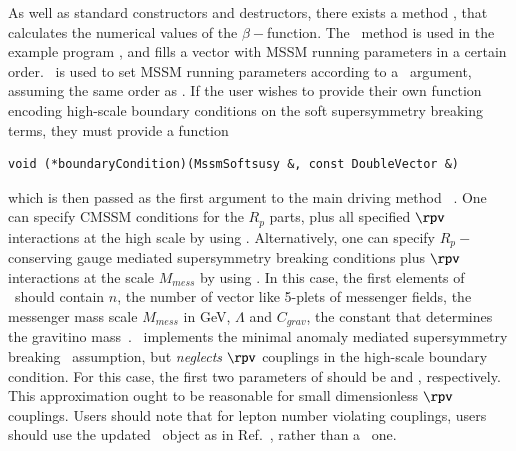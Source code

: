 \documentclass[final,3p,times,pdflatex]{elsarticle}
\begin{document}
As well as standard constructors and destructors, there exists a
  method , that calculates the numerical values of the
  $\beta-$function\@. The ~method is used in the example program
  , and fills a vector with MSSM running parameters in a
  certain   order. 
 ~is used to set MSSM running parameters according to a
 ~argument, assuming the same order as .
 If the user
  wishes to provide their own function encoding high-scale boundary conditions
  on the soft supersymmetry breaking terms, they must provide a function
\begin{verbatim}
void (*boundaryCondition)(MssmSoftsusy &, const DoubleVector &)
\end{verbatim}
which is then passed as the first argument to the main driving method 
~\cite{Allanach:2001kg}. 
One can specify CMSSM conditions for
the $R_p$ parts, plus all specified $\rpv$ interactions at the high scale 
by using . Alternatively, one can specify
$R_p-$conserving gauge mediated supersymmetry breaking conditions plus $\rpv$
interactions at the scale $M_{mess}$ by using . In this case,
the first elements of ~should contain $n$, the number of vector
like 5-plets of 
messenger fields, the messenger mass scale $M_{mess}$ in GeV, $\Lambda$ and
$C_{grav}$, the constant that determines the gravitino
mass~\cite{Ambrosanio:1997rv}.  ~implements the
minimal anomaly mediated supersymmetry breaking~\cite{Randall:1998uk} 
assumption, but {\em neglects} $\rpv$ couplings in the high-scale boundary
condition. For this case, the first two parameters of  should be
 and , respectively.
This approximation ought to be reasonable for small dimensionless
$\rpv$ couplings.
Users should note that for lepton number violating couplings,
users should use the updated ~object as in
Ref.~\cite{rpvneut}, rather than a 
~one.
\end{document}
